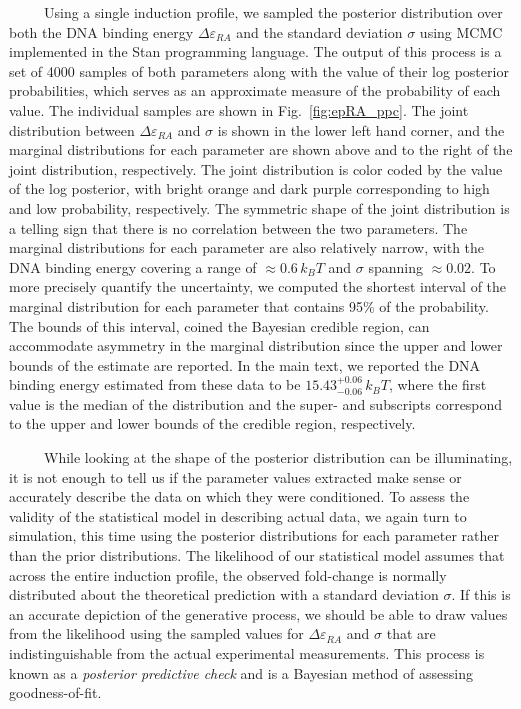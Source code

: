 \documentclass[12pt]{caltech_thesis}
\begin{document}
~~~~~Using a single induction profile, we sampled the posterior
distribution over both the DNA binding energy \(\Delta\varepsilon_{RA}\)
and the standard deviation \(\sigma\) using MCMC implemented in the Stan
programming language. The output of this process is a set of 4000
samples of both parameters along with the value of their log posterior
probabilities, which serves as an approximate measure of the probability
of each value. The individual samples are shown in
Fig.~\ref{fig:epRA_ppc}. The joint distribution between
\(\Delta\varepsilon_{RA}\) and \(\sigma\) is shown in the lower left
hand corner, and the marginal distributions for each parameter are shown
above and to the right of the joint distribution, respectively. The
joint distribution is color coded by the value of the log posterior,
with bright orange and dark purple corresponding to high and low
probability, respectively. The symmetric shape of the joint distribution
is a telling sign that there is no correlation between the two
parameters. The marginal distributions for each parameter are also
relatively narrow, with the DNA binding energy covering a range of
\(\approx 0.6\, k_BT\) and \(\sigma\) spanning \(\approx 0.02\). To more
precisely quantify the uncertainty, we computed the shortest interval of
the marginal distribution for each parameter that contains 95\% of the
probability. The bounds of this interval, coined the Bayesian credible
region, can accommodate asymmetry in the marginal distribution since the
upper and lower bounds of the estimate are reported. In the main text,
we reported the DNA binding energy estimated from these data to be
\(15.43^{+0.06}_{-0.06}\, k_BT\), where the first value is the median of
the distribution and the super- and subscripts correspond to the upper
and lower bounds of the credible region, respectively.

~~~~~While looking at the shape of the posterior distribution can be
illuminating, it is not enough to tell us if the parameter values
extracted make sense or accurately describe the data on which they were
conditioned. To assess the validity of the statistical model in
describing actual data, we again turn to simulation, this time using the
posterior distributions for each parameter rather than the prior
distributions. The likelihood of our statistical model assumes that
across the entire induction profile, the observed fold-change is
normally distributed about the theoretical prediction with a standard
deviation \(\sigma\). If this is an accurate depiction of the generative
process, we should be able to draw values from the likelihood using the
sampled values for \(\Delta\varepsilon_{RA}\) and \(\sigma\) that are
indistinguishable from the actual experimental measurements. This
process is known as a \emph{posterior predictive check} and is a
Bayesian method of assessing goodness-of-fit.
\end{document}
